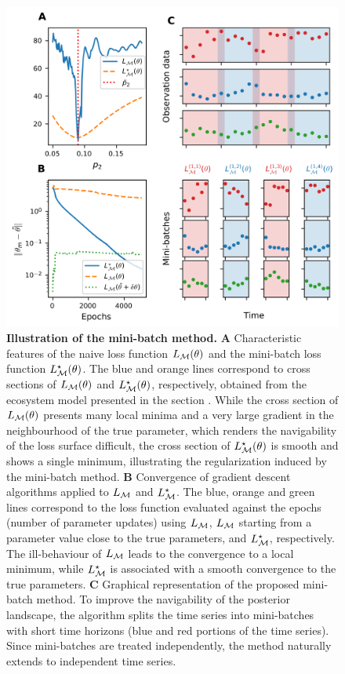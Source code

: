 \begin{figure}[ht]
    \centering
    \includegraphics[]{figures/figure1.png}
    \caption{\textbf{Illustration of the mini-batch method.} 
    \textbf{A} Characteristic features of the naive loss function $L_{\mathcal{M}}(\theta)$ and the mini-batch loss function $L_{\mathcal{M}}^\star(\theta)$. The blue and orange lines correspond to cross sections of $L_{\mathcal{M}}(\theta)$ and $L_{\mathcal{M}}^\star(\theta)$, respectively, obtained from the ecosystem model presented in the section . While the cross section of $L_{\mathcal{M}}(\theta)$ presents many local minima and a very large gradient in the neighbourhood of the true parameter, which renders the navigability of the loss surface difficult, the cross section of $L_{\mathcal{M}}^\star(\theta)$ is smooth and shows a single minimum, illustrating the regularization induced by the mini-batch method. 
%
    \textbf{B} Convergence of gradient descent algorithms applied to $L_{\mathcal{M}}$ and $L_{\mathcal{M}}^\star$. The blue, orange and green lines correspond to the loss function evaluated against the epochs (number of parameter updates) using $L_{\mathcal{M}}$, $L_{\mathcal{M}}$ starting from a parameter value close to the true parameters, and $L_{\mathcal{M}}^\star$, respectively. The ill-behaviour of $L_{\mathcal{M}}$ leads to the convergence to a local minimum, while  $L_{\mathcal{M}}^\star$ is associated with a smooth convergence to the true parameters.
    \textbf{C} Graphical representation of the proposed mini-batch method. To improve the navigability of the posterior landscape, the algorithm splits the time series into mini-batches with short time horizons (blue and red portions of the time series). Since mini-batches are treated independently, the method naturally extends to independent time series.}
    \label{fig:training_on_mini-batches}
\end{figure}
\FloatBarrier

